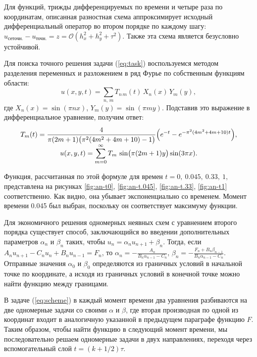 \documentclass[a4paper,12pt]{article}
\def\mysection#1{\vspace{\baselineskip}{\noindent\large\centering\bf#1\par}}
\begin{document}
\mysection{Аппроксимация и устойчивость}
Для функций, трижды дифференцируемых по времени и четыре раза по координатам, описанная разностная схема аппроксимирует исходный дифференциальный оператор во втором порядке по каждому шагу: $u_\text{сеточн.}-u_\text{точн.}=z=\mathcal{O}(h_x^2+h_y^2+\tau^2)$. Также эта схема является безусловно устойчивой.

\mysection{Аналитическое решение}
Для поиска точного решения задачи (\ref{eq:task}) воспользуемся методом разделения переменных и разложением в ряд Фурье по собственным функциям области: $$u(x,y,t)=\sum\limits_{n,\,m}T_{n\,m}(t)\,X_n(x)\,Y_m(y),$$ где $X_n(x)=\sin(\pi nx)$, $Y_m(y)=\sin(\pi my)$. Подставив это выражение в дифференциальное уравнение, получим ответ:
\begin{equation}
\def\arraystretch{1.8}
\begin{array}{c}\displaystyle
T_m(t)=\frac{4}{\pi(2m+1)\big(\pi^2(4m^2+4m+10)-1\big)}\Big(e^{-t}-e^{-\pi^2(4m^2+4m+10)t}\Big),\\
\displaystyle
u(x,y,t)=\sum\limits_{m=0}^\infty T_m\,\sin\!\big(\pi (2m+1)y\big)\sin(3\pi x).
\end{array}
\label{eq:an}
\end{equation}

Функция, рассчитанная по этой формуле для времен $t=0,\ 0.045,\ 0.33,\ 1$, представлена на рисунках \ref{fig:an-t0}, \ref{fig:an-t.045}, \ref{fig:an-t.33}, \ref{fig:an-t1} соответственно. Как видно, она убывает экспоненциально со временем. Момент времени 0.045 был выбран, поскольку он соответствует максимуму функции.

\mysection{Алгоритм решения}
Для экономичного решения одномерных неявных схем с уравнением второго порядка существует способ, заключающийся во введении дополнительных параметров $\alpha_n$ и $\beta_n$ таких, чтобы $u_n=\alpha_nu_{n+1}+\beta_n$. Тогда, если $A_n u_{n+1}-C_nu_n+B_nu_{n-1}=F_n$, то $\alpha_{n}=-\frac{A_n}{B_n\alpha_{n-1}-C_n}$, $\beta_n=-\frac{F_n+B_n\beta_{n-1}}{B_n\alpha_{n-1}-C_n}$. Отправные значения $\alpha_0$ и $\beta_0$ определяются из граничных условий в начальной точке по координате, а исходя из граничных условий в конечной точке можно найти функцию между границами.

В задаче (\ref{eq:scheme}) в каждый момент времени два уравнения разбиваются на две одномерные задачи со своими $\alpha$ и $\beta$, где вторая производная по одной из координат входит в аналогичную указанной в предыдущем параграфе функцию $F$. Таким образом, чтобы найти функцию в следующий момент времени, мы последовательно решаем одномерные задачи в двух направлениях, переходя через вспомогательный слой $t=(k+1/2)\tau$. 
\end{document}
